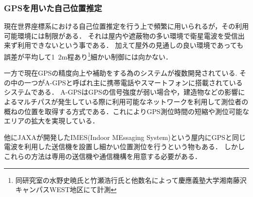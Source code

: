\subsubsection{GPSを用いた自己位置推定}
現在世界座標系における自己位置推定を行う上で頻繁に用いられるが，その利用可能環境には制限がある．
それは屋内や遮蔽物の多い環境で衛星電波を受信出来ず利用できないという事である．
加えて屋外の見通しの良い環境であっても誤差が平均して1~2m程あり\footnote{同研究室の水野史暁氏と竹瀬浩行氏と他数名によって慶應義塾大学湘南藤沢キャンパスWEST地区にて計測}細かい制御には向かない．

一方で現在GPSの精度向上や補助をする為のシステムが複数開発されている.
その中の一つがA-GPS\cite{agps}と呼ばれ主に携帯電話やスマートフォンに搭載されているシステムである．
A-GPSはGPSの信号強度が弱い場合や，建造物などの影響によるマルチパスが発生している際に利用可能なネットワークを利用して測位者の概ねの位置を取得する方式である．これによりGPS測位時間の短縮や測位可能なエリアの拡大を実現している．

他にJAXAが開発したIMES(Indoor MEssaging System)\cite{imes}という屋内にGPSと同じ電波を利用した送信機を設置し細かい位置測位を行うという物もある．
しかしこれらの方法は専用の送信機や通信機構を用意する必要がある．